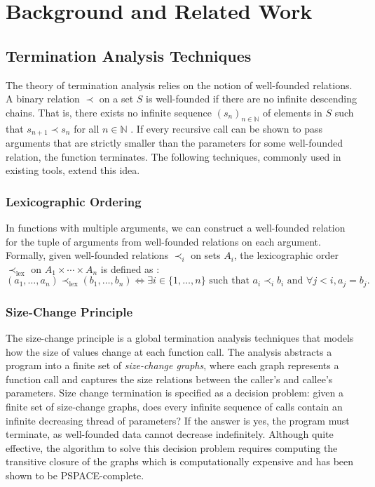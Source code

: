 \chapter{Background and Related Work}

\section{Termination Analysis Techniques}

The theory of termination analysis relies on the notion of well-founded
relations. A binary relation $\prec$ on a set $S$ is well-founded if there are
no infinite descending chains. That is, there exists no infinite sequence
$(s_n)_{n\in\mathbb{N}}$ of elements in $S$ such that $s_{n+1} \prec s_n$
for all $n\in\mathbb{N}$ \cite[31]{programSemantics}.
If every recursive call can be shown to pass arguments that are strictly
smaller than the parameters for some well-founded relation, the function
terminates.
The following techniques, commonly used in existing tools, extend this idea.

\subsection{Lexicographic Ordering}
In functions with multiple arguments, we can construct a well-founded relation
for the tuple of arguments from well-founded relations on each argument. 
Formally, given well-founded relations $\prec_i$ on sets $A_i$, the
lexicographic order $\prec_\text{lex}$ on $A_1\times\cdots\times A_n$ is defined
as \cite[175]{programSemantics}:
$$ (a_1, \ldots, a_n) \prec_\text{lex} (b_1, \ldots, b_n) \iff
\exists i\in\{1, \ldots, n\} \text{ such that } a_i \prec_i b_i
\text{ and } \forall j<i, a_j = b_j .$$


\subsection{Size-Change Principle}
The size-change principle \cite{SizeChange} is a global termination analysis
techniques that models how the size of values change at each function call.
The analysis abstracts a program into a finite set of
\emph{size-change graphs}, where each graph represents a function call and
captures the size relations between the caller's and callee's parameters.
Size change termination is specified as a decision problem: given a finite set
of size-change graphs, does every infinite sequence of calls contain an infinite
decreasing thread of parameters? If the answer is yes, the program must
terminate, as well-founded data cannot decrease indefinitely.
Although quite effective, the algorithm to solve this decision problem requires
computing the transitive closure of the graphs which is computationally
expensive and has been shown to be \textsf{PSPACE-complete}.

